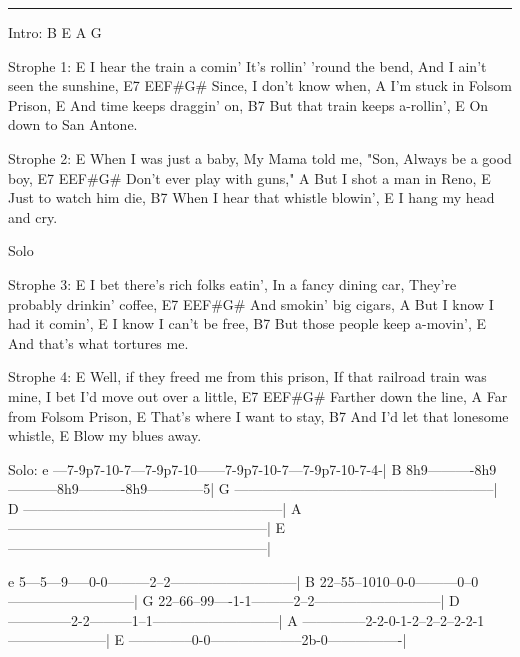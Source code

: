 \noindent\rule{\columnwidth}{1pt}

\begin{multicols}{2}
\begin{lstsong}
Intro:  B E A G

Strophe 1:
E
I hear the train a comin'
It's rollin' 'round the bend,
And I ain't seen the sunshine,
       E7          EEF#G#
Since, I don't know when,
A
I'm stuck in Folsom Prison,
                        E
And time keeps draggin' on,
         B7
But that train keeps a-rollin',
                  E
On down to San Antone.

Strophe 2:
E
When I was just a baby,
My Mama told me, "Son,
Always be a good boy,
      E7             EEF#G#
Don't ever play with guns,"
A
But I shot a man in Reno,
                  E
Just to watch him die,
       B7
When I hear that whistle blowin',
                   E
I hang my head and cry.

Solo

Strophe 3:
E
I bet there's rich folks eatin',
In a fancy dining car,
They're probably drinkin' coffee,
     E7         EEF#G#
And smokin' big cigars,
A
But I know I had it comin',
                  E
I know I can't be free,
     B7
But those people keep a-movin',
                         E
And that's what tortures me.

Strophe 4:
E
Well, if they freed me from this prison,
If that railroad train was mine,
I bet I'd move out over a little,
        E7       EEF#G#
Farther down the line,
A
Far from Folsom Prison,
                       E
That's where I want to stay,
        B7
And I'd let that lonesome whistle,
               E
Blow my blues away.
\end{lstsong}
\end{multicols}
\begin{lsttab}
Solo:
e ---7-9p7-10-7---7-9p7-10------7-9p7-10-7---7-9p7-10-7-4-|
B 8h9----------8h9-----------8h9----------8h9------------5|
G --------------------------------------------------------|
D --------------------------------------------------------|
A --------------------------------------------------------|
E --------------------------------------------------------|

e 5---5---9-----0-0---------2--2---------------------------|
B 22--55--1010--0-0---------0--0---------------------------|
G 22--66--99----1-1---------2--2---------------------------|
D --------------2-2---------1--1---------------------------|
A --------------2-2-0-1-2--2--2--2-2-1---------------------|
E --------------0-0--------------------2b-0----------------|
\end{lsttab}
\newpage

